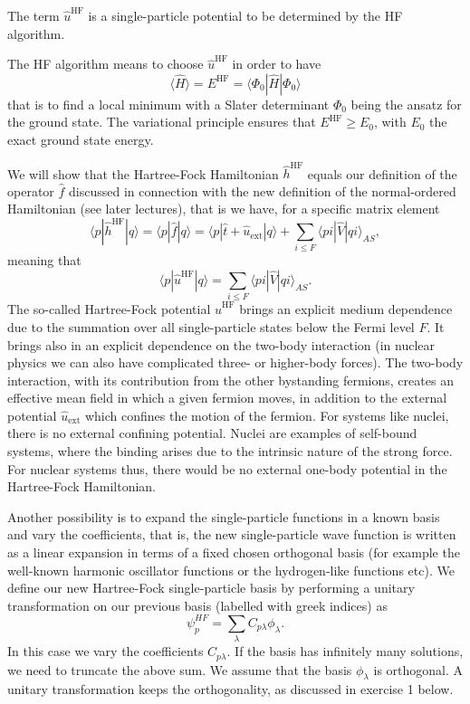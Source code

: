 The term $\hat{u}^{\mathrm{HF}}$ is a single-particle potential to be
determined by the HF algorithm.

The HF algorithm means to choose $\hat{u}^{\mathrm{HF}}$ in order to
have
\[ \langle \hat{H} \rangle = E^{\mathrm{HF}}= \langle \Phi_0 | \hat{H}|\Phi_0 \rangle
\]
that is to find a local minimum with a Slater determinant $\Phi_0$
being the ansatz for the ground state.  The variational principle
ensures that $E^{\mathrm{HF}} \ge E_0$, with $E_0$ the exact ground
state energy.

We will show that the Hartree-Fock Hamiltonian $\hat{h}^{\mathrm{HF}}$
equals our definition of the operator $\hat{f}$ discussed in
connection with the new definition of the normal-ordered Hamiltonian
(see later lectures), that is we have, for a specific matrix element
\[
\langle p |\hat{h}^{\mathrm{HF}}| q \rangle =\langle p |\hat{f}| q \rangle=\langle p|\hat{t}+\hat{u}_{\mathrm{ext}}|q \rangle +\sum_{i\le F} \langle pi | \hat{V} | qi\rangle_{AS},
\]
meaning that
\[
\langle p|\hat{u}^{\mathrm{HF}}|q\rangle = \sum_{i\le F} \langle pi | \hat{V} | qi\rangle_{AS}.
\]
The so-called Hartree-Fock potential $\hat{u}^{\mathrm{HF}}$ brings an
explicit medium dependence due to the summation over all
single-particle states below the Fermi level $F$. It brings also in an
explicit dependence on the two-body interaction (in nuclear physics we
can also have complicated three- or higher-body forces). The two-body
interaction, with its contribution from the other bystanding fermions,
creates an effective mean field in which a given fermion moves, in
addition to the external potential $\hat{u}_{\mathrm{ext}}$ which
confines the motion of the fermion. For systems like nuclei, there is
no external confining potential. Nuclei are examples of self-bound
systems, where the binding arises due to the intrinsic nature of the
strong force. For nuclear systems thus, there would be no external
one-body potential in the Hartree-Fock Hamiltonian.


Another possibility is to expand the single-particle functions in a
known basis and vary the coefficients, that is, the new
single-particle wave function is written as a linear expansion in
terms of a fixed chosen orthogonal basis (for example the well-known
harmonic oscillator functions or the hydrogen-like functions etc).  We
define our new Hartree-Fock single-particle basis by performing a
unitary transformation on our previous basis (labelled with greek
indices) as
\begin{equation}
\psi_p^{HF}  = \sum_{\lambda} C_{p\lambda}\phi_{\lambda}. \label{eq:newbasis}
\end{equation}
In this case we vary the coefficients $C_{p\lambda}$. If the basis has
infinitely many solutions, we need to truncate the above sum.  We
assume that the basis $\phi_{\lambda}$ is orthogonal. A unitary
transformation keeps the orthogonality, as discussed in exercise 1
below.




